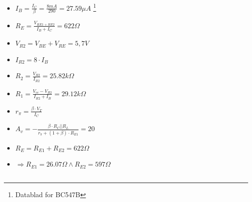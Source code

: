 \documentclass{beamer}
\begin{document}
\begin{frame}
\begin{columns}[onlytextwidth]
\begin{column}{0.6\textwidth}
\begin{itemize}
	\item $I_B = \frac{I_C}{\beta} = \frac{8mA}{290}=27.59\mu A $ \footnote{Datablad for BC547B}
	\item $R_E = \frac{V_{RE1+RE2}}{I_B+I_C} = 622\Omega $
	\item $V_{R2} = V_{BE} + V_{RE} = 5,7V$
	\item $I_{R2} = 8\cdot I_B$
	\item $R_2 = \frac{V_{R2}}{I_{R2}} = 25.82k\Omega $
	\item $R_1 = \frac{V_{cc}-V_{R2}}{I_{R2}+I_B} = 29.12k\Omega$
	\item $r_{\pi} = \frac{\beta \cdot V_T}{I_C}$
	\item $A_v = - \frac{\beta \cdot R_C || R_L}{r_{\pi}+(1+\beta)\cdot R_{E1}} = 20$
	\item $R_E = R_{E1} + R_{E2} = 622\Omega$
	\item $\Rightarrow R_{E1}= 26.07\Omega \wedge R_{E2}=597\Omega$
	\end{itemize}		
  \end{column}
\end{columns}
\end{frame}
\end{document}
